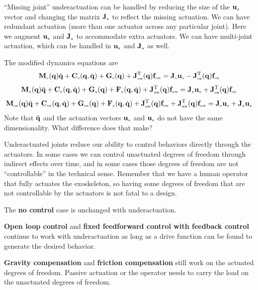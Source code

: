 \documentclass[letterpaper,12pt,fullpage]{article}
\newcommand{\myo}{{\mbox {\tiny o}}}
\newcommand{\myx}{{\mbox {\tiny x}}}
\newcommand{\ox}{{\mbox {\tiny ox}}}
\newcommand{\ow}{{\mbox {\tiny ow}}}
\newcommand{\xw}{{\mbox {\tiny xw}}}
\begin{document}
``Missing joint''
underactuation can be handled by reducing the size of the $\vu_{\myx}$ vector
and changing the matrix $\mJ_{\myx}$ to reflect the missing actuation.
We can have redundant actuation (more than one actuator across any particular
joint). Here we augment $\vu_{\myx}$ and $\mJ_{\myx}$ to accommodate extra actuators.
We can have multi-joint actuation, which can be handled in $\vu_{\myx}$ 
and $\mJ_{\myx}$ as well.

The modified dynamics equations are
\begin{equation}
\mM_{\myo}(\vq) \ddot{\vq} + \mC_{\myo}(\vq,\dot{\vq}) + \mG_{\myo}(\vq)
+ \mJ_{\ow}^{\tr}(\vq) \vf_{\ow} = \mJ_{\myo} \vu_{\myo} - \mJ_{\ox}^{\tr}(\vq) \vf_{\ox}
\label{eq:odynamics2}
\end{equation}
\begin{equation}
\mM_{\myx}(\vq) \ddot{\vq} + \mC_{\myx}(\vq,\dot{\vq}) + \mG_{\myx}(\vq)
+ \mF_{\myx}(\vq,\dot{\vq})
+ \mJ_{\xw}^{\tr}(\vq) \vf_{\xw} = \mJ_{\myx} \vu_{\myx} + \mJ_{\ox}^{\tr}(\vq) \vf_{\ox}
\label{eq:xdynamics2}
\end{equation}
\begin{equation}
\mM_{\ox}(\vq) \ddot{\vq} + \mC_{\ox}(\vq,\dot{\vq}) + \mG_{\ox}(\vq)
+ \mF_{\myx}(\vq,\dot{\vq})
+ \mJ_{\ow}^{\tr}(\vq) \vf_{\ow}
+ \mJ_{\xw}^{\tr}(\vq) \vf_{\xw} 
= \mJ_{\myo} \vu_{\myo} + \mJ_{\myx} \vu_{\myx}
\label{eq:oxdynamics2}
\end{equation}
Note that $\ddot{{\bf q}}$ and the actuation vectors $\vu_{\myo}$ and $\vu_{\myx}$
do not have the same dimensionality. What difference does that make?

Underactuated joints reduce our ability to control behaviors directly
through the actuators. In some cases we can control unactuated degrees of freedom
through indirect effects over time, and in some cases those degrees of freedom
are not ``controllable'' in the technical sense. Remember that we have a human
operator that fully actuates the exoskeleton, so having some degrees of freedom
that are not controllable by the actuators is not fatal to a design.

The {\bf no control} case is unchanged with underactuation.

{\bf Open loop control} 
and
{\bf fixed feedforward control with feedback control}
continue to work with underactuation
as long as a drive function can be found
to generate the desired behavior.

{\bf Gravity compensation} and {\bf friction compensation}
still work on the actuated degrees
of freedom. Passive actuation or 
the operator needs to carry the load on the unactuated degrees of freedom.
\end{document}
